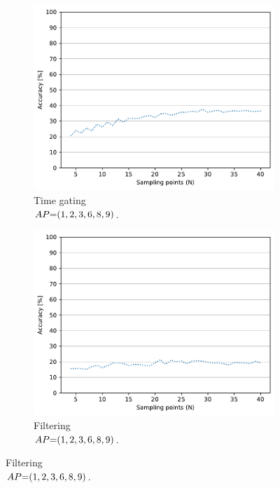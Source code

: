 \begin{figure}[ht]
  \begin{subfigure}{.49\textwidth}
    \centering
    \includegraphics[width=.99\linewidth]{Figures/RadarExperiments/Datasets/ThroughMaterials/Glass+Wood/samples-timegating-ud.pdf}
    \vspace{-15pt}
    \captionsetup{width=.99\linewidth}
    \caption{Time gating \\ $\splitatcommas{AP{=}(1, 2, 3, 6, 8, 9)}$.}
    \label{fig:radar-experiments:through-materials:glass-wood-samples:timegating-ud}
  \end{subfigure}
  \begin{subfigure}{.49\textwidth}
    \centering
    \includegraphics[width=.99\linewidth]{Figures/RadarExperiments/Datasets/ThroughMaterials/Glass+Wood/samples-filtering-ud.pdf}  
    \vspace{-15pt}
    \captionsetup{width=.99\linewidth}
    \caption{Filtering \\ $\splitatcommas{AP{=}(1, 2, 3, 6, 8, 9)}$.}
    \label{fig:radar-experiments:through-materials:glass-wood-samples:filtering-ud}
  \end{subfigure}


\end{figure}
